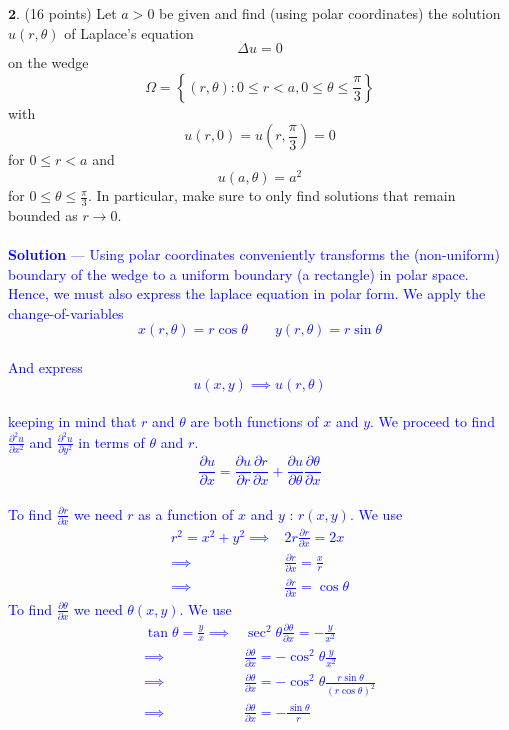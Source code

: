 \documentclass[12pt]{article}
\begin{document}
\noindent $\textbf{2}$. (16 points) Let $a > 0$ be given and find (using polar coordinates) the solution $u(r,\theta)$ of Laplace's equation
$$\Delta u = 0$$
on the wedge
$$ \Omega = \left \{ (r,\theta) : 0 \leq r < a, 0 \leq \theta \leq \frac{\pi}{3} \right \}$$
with
$$u(r,0) = u\left (r,\frac{\pi}{3} \right)  = 0$$
for $0 \leq r < a$ and
$$u(a,\theta) = a^2$$
for $0 \leq \theta \leq \frac{\pi}{3}$.
In particular, make sure to only find solutions that remain bounded as $r \to 0$. \\ \\
\textcolor{blue}{\textbf{Solution} — Using polar coordinates conveniently transforms the (non-uniform) boundary of the wedge to a uniform boundary (a rectangle) in polar space. Hence, we must also express the laplace equation in polar form. We apply the change-of-variables $$x(r, \theta) = r \cos \theta \;\;\;\;\;\;\; y(r, \theta) = r \sin \theta$$ \\
And express $$u(x,y) \implies u(r,\theta)$$ \\
keeping in mind that $r$ and $\theta$ are both functions of $x$ and $y$. We proceed to find $\frac{\partial^2 u}{\partial x^2}$ and $\frac{\partial^2 u}{\partial y^2}$ in terms of $\theta$ and $r$. $$\frac{\partial u}{\partial x} = \frac{\partial u}{\partial r} \frac{\partial r}{\partial x} + \frac{\partial u}{\partial \theta} \frac{\partial \theta}{\partial x}$$ \\
To find $\frac{\partial r}{\partial x}$ we need $r$ as a function of $x$ and $y$ : $r(x,y)$. We use
\begin{align*}
r^2 = x^2 + y^2 \implies& 2r \frac{\partial r}{\partial x} = 2x \\
\implies& \frac{\partial r}{\partial x} = \frac{x}{r} \\
\implies& \boxed{\frac{\partial r}{\partial x} = \cos \theta}
\end{align*}
To find $\frac{\partial \theta}{\partial x}$ we need $\theta(x,y)$. We use
\begin{align*}
\tan \theta = \frac{y}{x} \implies& \sec^2 \theta \frac{\partial \theta}{\partial x} = -\frac{y}{x^2} \\
\implies& \frac{\partial \theta}{\partial x} = - \cos^2 \theta \frac{y}{x^2} \\
\implies& \frac{\partial \theta}{\partial x} = - \cos^2 \theta \frac{r \sin \theta}{(r \cos \theta)^2} \\
\implies& \boxed{\frac{\partial \theta}{\partial x} = - \frac{\sin \theta}{r}} \\
\end{align*}
}
\end{document}

